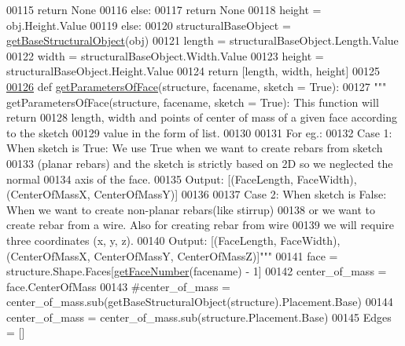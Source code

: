 \begin{DoxyCode}
00115                 \textcolor{keywordflow}{return} \textcolor{keywordtype}{None}
00116         \textcolor{keywordflow}{else}:
00117             \textcolor{keywordflow}{return} \textcolor{keywordtype}{None}
00118         height = obj.Height.Value
00119     \textcolor{keywordflow}{else}:
00120         structuralBaseObject = \hyperlink{namespaceRebarfunc_a20bba2119d962302eada384246cd6270}{getBaseStructuralObject}(obj)
00121         length = structuralBaseObject.Length.Value
00122         width = structuralBaseObject.Width.Value
00123         height = structuralBaseObject.Height.Value
00124     \textcolor{keywordflow}{return} [length, width, height]
00125 
\hypertarget{Rebarfunc_8py_source.tex_l00126}{}\hyperlink{namespaceRebarfunc_a92122b3d7cedd3d47bb63380a5ac4d08}{00126} \textcolor{keyword}{def }\hyperlink{namespaceRebarfunc_a92122b3d7cedd3d47bb63380a5ac4d08}{getParametersOfFace}(structure, facename, sketch = True):
00127     \textcolor{stringliteral}{""" getParametersOfFace(structure, facename, sketch = True): This function will return}
00128 \textcolor{stringliteral}{    length, width and points of center of mass of a given face according to the sketch}
00129 \textcolor{stringliteral}{    value in the form of list.}
00130 \textcolor{stringliteral}{}
00131 \textcolor{stringliteral}{    For eg.:}
00132 \textcolor{stringliteral}{    Case 1: When sketch is True: We use True when we want to create rebars from sketch}
00133 \textcolor{stringliteral}{        (planar rebars) and the sketch is strictly based on 2D so we neglected the normal}
00134 \textcolor{stringliteral}{        axis of the face.}
00135 \textcolor{stringliteral}{        Output: [(FaceLength, FaceWidth), (CenterOfMassX, CenterOfMassY)]}
00136 \textcolor{stringliteral}{}
00137 \textcolor{stringliteral}{    Case 2: When sketch is False: When we want to create non-planar rebars(like stirrup)}
00138 \textcolor{stringliteral}{        or we want to create rebar from a wire. Also for creating rebar from wire}
00139 \textcolor{stringliteral}{        we will require three coordinates (x, y, z).}
00140 \textcolor{stringliteral}{        Output: [(FaceLength, FaceWidth), (CenterOfMassX, CenterOfMassY, CenterOfMassZ)]"""}
00141     face = structure.Shape.Faces[\hyperlink{namespaceRebarfunc_a3885b3b63e3a41508ac79bc7550cf301}{getFaceNumber}(facename) - 1]
00142     center\_of\_mass = face.CenterOfMass
00143     \textcolor{comment}{#center\_of\_mass = center\_of\_mass.sub(getBaseStructuralObject(structure).Placement.Base)}
00144     center\_of\_mass = center\_of\_mass.sub(structure.Placement.Base)
00145     Edges = []

\end{DoxyCode}
